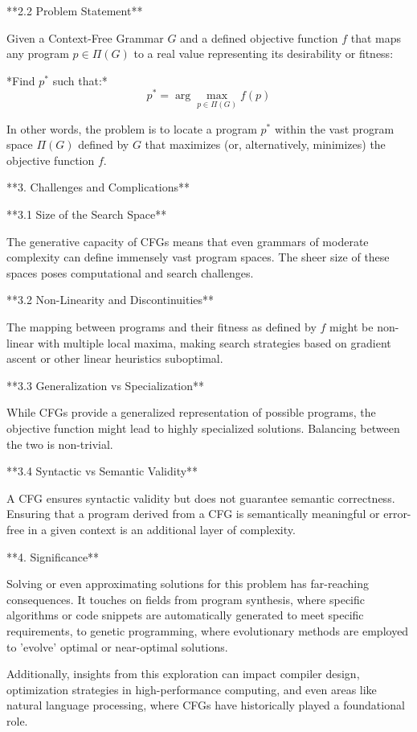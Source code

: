 **2.2 Problem Statement**

Given a Context-Free Grammar \( G \) and a defined objective function \( f \) that maps any program \( p \in \Pi(G) \) to a real value representing its desirability or fitness:

*Find \( p^* \) such that:*
\[ p^* = \arg\max_{p \in \Pi(G)} f(p) \]

In other words, the problem is to locate a program \( p^* \) within the vast program space \( \Pi(G) \) defined by \( G \) that maximizes (or, alternatively, minimizes) the objective function \( f \).

**3. Challenges and Complications**

**3.1 Size of the Search Space**

The generative capacity of CFGs means that even grammars of moderate complexity can define immensely vast program spaces. The sheer size of these spaces poses computational and search challenges.

**3.2 Non-Linearity and Discontinuities**

The mapping between programs and their fitness as defined by \( f \) might be non-linear with multiple local maxima, making search strategies based on gradient ascent or other linear heuristics suboptimal.

**3.3 Generalization vs Specialization**

While CFGs provide a generalized representation of possible programs, the objective function might lead to highly specialized solutions. Balancing between the two is non-trivial.

**3.4 Syntactic vs Semantic Validity**

A CFG ensures syntactic validity but does not guarantee semantic correctness. Ensuring that a program derived from a CFG is semantically meaningful or error-free in a given context is an additional layer of complexity.

**4. Significance**

Solving or even approximating solutions for this problem has far-reaching consequences. It touches on fields from program synthesis, where specific algorithms or code snippets are automatically generated to meet specific requirements, to genetic programming, where evolutionary methods are employed to 'evolve' optimal or near-optimal solutions.

Additionally, insights from this exploration can impact compiler design, optimization strategies in high-performance computing, and even areas like natural language processing, where CFGs have historically played a foundational role.

